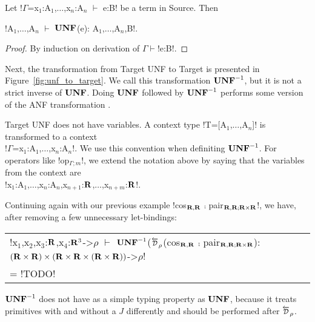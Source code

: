 \begin{lemma}
    Let !$\Gamma$=x$_1$:A$_{1}$,$\ldots$,x$_n$:A$_{n}$ $\vdash$ e:B! be a term in Source. Then
    \begin{center}
        !A$_{1}$,$\ldots$,A$_{n}$ $\vdash$ $\mathbf{UNF}$(e): A$_{1}$,$\ldots$,A$_{n}$,B!.
    \end{center}
\end{lemma}
\begin{proof}
    By induction on derivation of $\Gamma\vdash$!e:B!.
\end{proof}



Next, the transformation from Target UNF to Target is presented in Figure~\ref{fig:unf_to_target}. 
We call this transformation $\mathbf{UNF}^{-1}$, but it is not a strict inverse of $\mathbf{UNF}$.
Doing $\mathbf{UNF}$ followed by $\mathbf{UNF}^{-1}$ performs some version of the ANF transformation \cite{sabry1993reasoning}.

Target UNF does not have variables. 
A context type !T=[A$_1$,$\ldots$,A$_n$]! is transformed to a context \\
!$\Gamma$=x$_1$:A$_1$,$\ldots$,x$_n$:A$_n$!.
We use this convention when definiting $\mathbf{UNF}^{-1}$. 
For operators like !op$_{\Gamma;m}$!, we extend the notation above by saying that the variables from the context are \\
!x$_1$:A$_1$,$\ldots$,x$_n$:A$_n$,x$_{n+1}$:$\mathbf{R}$,$\ldots$,x$_{n+m}$:$\mathbf{R}$!.

\begin{example}
    Continuing again with our previous example !cos$_{\mathbf{R},\mathbf{R}}$ $\comp$ pair$_{\mathbf{R},\mathbf{R}; \mathbf{R}\times\mathbf{R}}$!, 
    we have, after removing a few unnecessary let-bindings:

    \begin{tabular}{l}
        !x$_1$,x$_2$,x$_3$:$\mathbf{R}$,x$_4$:$\mathbf{R}^3$->$\rho$ $\vdash$ $\mathbf{UNF}^{-1}$($\Dsynrevsymbol_{\rho}$(cos$_{\mathbf{R},\mathbf{R}}$ $\comp$ pair$_{\mathbf{R},\mathbf{R}; \mathbf{R}\times\mathbf{R}}$): $(\mathbf{R}\times\mathbf{R}) \times (\mathbf{R}\times\mathbf{R}\times(\mathbf{R}\times\mathbf{R}))$->$\rho$! \\
        = !TODO!
    \end{tabular}
\end{example}

$\mathbf{UNF}^{-1}$ does not have as a simple typing property as $\mathbf{UNF}$, 
because it treats primitives with and without a $J$ differently and should be performed after $\Dsynrevsymbol_{\rho}$.

